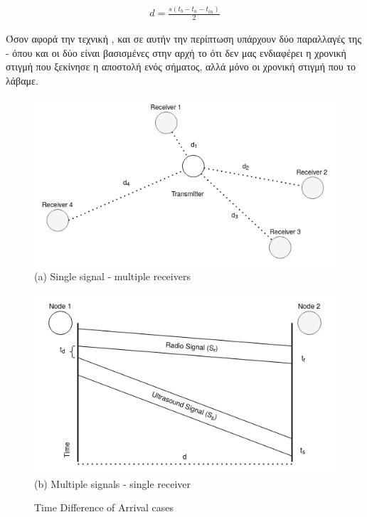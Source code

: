 \begin{align}
	d=\frac{s(t_b-t_a-t_{in})}{2} \label{eq:toa-roundtrip}
\end{align}


Όσον αφορά την τεχνική , και σε αυτήν την περίπτωση υπάρχουν δύο παραλλαγές της \cite{wsn-Localization-systems} - όπου και οι 
δύο είναι βασισμένες στην αρχή το ότι δεν μας ενδιαφέρει η χρονική στιγμή που ξεκίνησε η αποστολή ενός σήματος, αλλά μόνο
οι χρονική στιγμή που το λάβαμε.

\begin{figure} [H]
    \centering
    \begin{minipage}{.5\textwidth}
      \centering
      \includegraphics[width=0.8\linewidth]{../Photos/tdoa-multiple.png}\\
      {(a) Single signal - multiple receivers}
    \end{minipage}%
    \begin{minipage}{.5\textwidth}
      \centering
      \includegraphics[width=.8\linewidth]{../Photos/tdoa-timing.png}\\
      {(b) Multiple signals - single receiver}
    \end{minipage}
    \hfill \break
    \decoRule
    \caption[Time Difference of Arrival cases]{Time Difference of Arrival cases}
    \label{fig:Time-Difference-of-Arrival-cases}
\end{figure}


